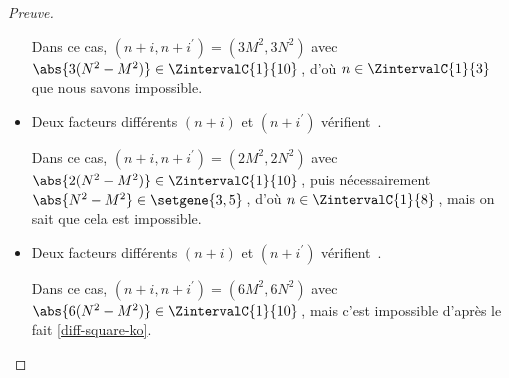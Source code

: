 \begin{proof}[Preuve]
\begin{itemize}
		\smallskip
		\noindent
		Dans ce cas, $(n+i, n+i^\prime) = (3 M^2, 3 N^2)$ avec $\abs{3(N^2 - M^2)} \in \ZintervalC{1}{10}$\,, d'où $n \in \ZintervalC{1}{3}$ que nous savons impossible.

    	\medskip
		\item Deux facteurs différents $(n+i)$ et $(n+i^\prime)$ vérifient \,.
		
		\smallskip
		\noindent
		Dans ce cas, $(n+i, n+i^\prime) = (2 M^2, 2 N^2)$ avec $\abs{2(N^2 - M^2)} \in \ZintervalC{1}{10}$\,, puis nécessairement $\abs{N^2 - M^2} \in \setgene{3, 5}$\,, d'où $n \in \ZintervalC{1}{8}$\,, mais on sait que cela est impossible.


    	\medskip
		\item Deux facteurs différents $(n+i)$ et $(n+i^\prime)$ vérifient \,.
		
		\smallskip
		\noindent
		Dans ce cas, $(n+i, n+i^\prime) = (6 M^2, 6 N^2)$ avec $\abs{6(N^2 - M^2)} \in \ZintervalC{1}{10}$\,, mais c'est impossible d'après le fait \ref{diff-square-ko}.
		\qedhere
    \end{itemize}
\end{proof}

